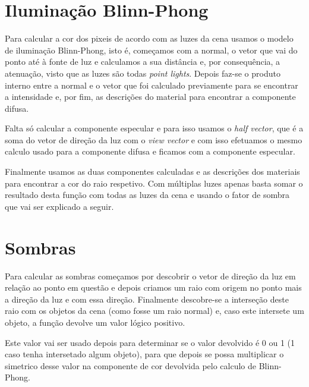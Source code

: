 \documentclass{article}
\begin{document}
        \section*{Iluminação Blinn-Phong}
        \par
        Para calcular a cor dos pixeis de acordo com as luzes da cena usamos o modelo de iluminação Blinn-Phong, isto é, começamos com a normal, 
        o vetor que vai do ponto até à fonte de luz e calculamos a sua distância e, por consequência, a atenuação, visto que as luzes são todas 
        \textit{point lights}. Depois faz-se o produto interno entre a normal e o vetor que foi calculado previamente para se encontrar a intensidade e, por fim, 
        as descrições do material para encontrar a componente difusa.
        \par
        Falta só calcular a componente especular e para isso usamos o \textit{half vector}, que é a soma do vetor de direção da luz com o \textit{view vector} e
        com isso efetuamos o mesmo calculo usado para a componente difusa e ficamos com a componente especular.
        \par
        Finalmente usamos as duas componentes calculadas e as descrições dos materiais para encontrar a cor do raio respetivo. Com múltiplas luzes apenas basta somar o resultado 
        desta função com todas as luzes da cena e usando o fator de sombra que vai ser explicado a seguir.
    \section*{Sombras}
        \par
        Para calcular as sombras começamos por descobrir o vetor de direção da luz em relação ao ponto em questão e
        depois criamos um raio com origem no ponto mais a direção da luz e com essa direção. Finalmente descobre-se a interseção deste raio com os objetos da cena (como 
        fosse um raio normal) e, caso este intersete um objeto, a função devolve um valor lógico positivo.
        \par
        Este valor vai ser usado depois para determinar se o valor devolvido é 0 ou 1 (1 caso tenha intersetado algum objeto), para que depois se possa 
        multiplicar o simetrico desse valor na componente de cor devolvida pelo calculo de Blinn-Phong.
\end{document}
